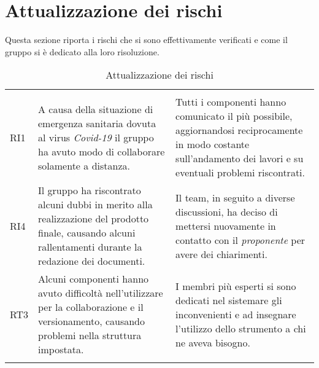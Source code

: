 \section{Attualizzazione dei rischi}

Questa sezione riporta i rischi che si sono effettivamente verificati e come il gruppo si è dedicato alla loro risoluzione.

\begin{longtable}{C{2.5cm} C{7cm} C{7cm}} 
 	 &
 	 &
 	 \\
 	
 	RI1 & A causa della situazione di emergenza sanitaria dovuta al virus \textit{Covid-19} il gruppo ha avuto modo di collaborare solamente a distanza. & Tutti i componenti hanno comunicato il più possibile, aggiornandosi reciprocamente in modo costante sull'andamento dei lavori e su eventuali problemi riscontrati. \\
 	RI4 & Il gruppo ha riscontrato alcuni dubbi in merito alla realizzazione del prodotto finale, causando alcuni rallentamenti durante la redazione dei documenti. & Il team, in seguito a diverse discussioni, ha deciso di mettersi nuovamente in contatto con il \textit{proponente} per avere dei chiarimenti. \\
 	RT3 & Alcuni componenti hanno avuto difficoltà nell'utilizzare  per la collaborazione e il versionamento, causando problemi nella struttura impostata. & I membri più esperti si sono dedicati nel sistemare gli inconvenienti e ad insegnare l'utilizzo dello strumento a chi ne aveva bisogno. \\
 	\caption{Attualizzazione dei rischi}
\end{longtable}